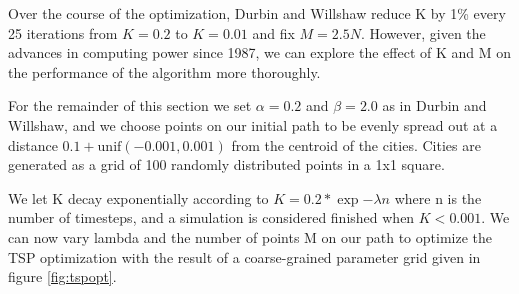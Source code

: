 \documentclass{article}
\begin{document}
Over the course of the optimization, Durbin and Willshaw reduce K by 1\% every 25 iterations from $K=0.2$ to $K=0.01$ and fix $M = 2.5N$. However, given the advances in computing power since 1987, we can explore the effect of K and M on the performance of the algorithm more thoroughly.

For the remainder of this section we set $\alpha = 0.2$ and $\beta = 2.0$ as in Durbin and Willshaw, and we choose points on our initial path to be evenly spread out at a distance $0.1+\text{unif}(-0.001, 0.001)$ from the centroid of the cities. Cities are generated as a grid of 100 randomly distributed points in a 1x1 square.

We let K decay exponentially according to $K = 0.2*\exp{-\lambda n}$ where n is the number of timesteps, and a simulation is considered finished when $K < 0.001$. We can now vary lambda and the number of points M on our path to optimize the TSP optimization with the result of a coarse-grained parameter grid given in figure \ref{fig:tspopt}.  
\end{document}
